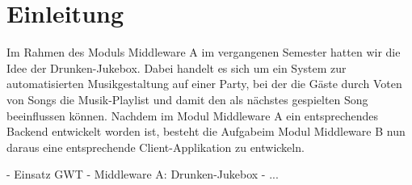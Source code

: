 \section{Einleitung}
Im Rahmen des Moduls Middleware A im vergangenen Semester hatten wir die Idee der Drunken-Jukebox. Dabei handelt es sich um ein System zur automatisierten Musikgestaltung auf einer Party, bei der die Gäste durch Voten von Songs die Musik-Playlist und damit den als nächstes gespielten Song beeinflussen können. Nachdem im Modul Middleware A ein entsprechendes Backend entwickelt worden ist, besteht die Aufgabeim Modul Middleware B nun daraus eine entsprechende Client-Applikation zu entwickeln.

- Einsatz GWT
- Middleware A: Drunken-Jukebox
- ...